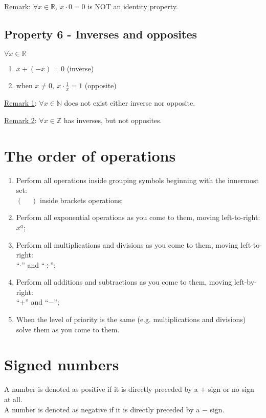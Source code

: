 \documentclass{article}
\begin{document}
\underline{Remark}: $\forall x \in \mathbb{R},\ x \cdot 0=0$ is
NOT an identity property.

\subsection{Property 6 - Inverses and opposites}
$\forall x \in \mathbb{R}$
\begin{enumerate}[label=\alph*)]
    \item $x+(-x)=0$ (inverse)
    \item when $x \neq 0,\ x \cdot \frac{1}{x}=1$ (opposite)
\end{enumerate}

\underline{Remark 1}: $\forall x \in \mathbb{N}$ does not exist either
inverse nor opposite.

\underline{Remark 2}: $\forall x \in \mathbb{Z}$ has inverses, but
not opposites.

\section{The order of operations}
\begin{enumerate}
    \item Perform all operations inside grouping symbols beginning with the innermost set:\\
        $\left(\phantom{-}\right)$ inside brackets operations;
    \item Perform all exponential operations as you come to them, moving left-to-right:\\
        $x^a$;
    \item Perform all multiplications and divisions as you come to them, moving left-to-right:\\
        ``$\cdot$'' and ``$\div$'';
    \item Perform all additions and subtractions as you come to them, moving left-by-right:\\
        ``$+$'' and ``$-$'';
    \item When the level of priority is the same (e.g. multiplications and divisions) solve them as you come to them.
\end{enumerate}

\section{Signed numbers}
A number is denoted as positive if it is directly preceded by a $+$ sign or no sign at all.\\
A number is denoted as negative if it is directly preceded by a $-$ sign.
\end{document}
